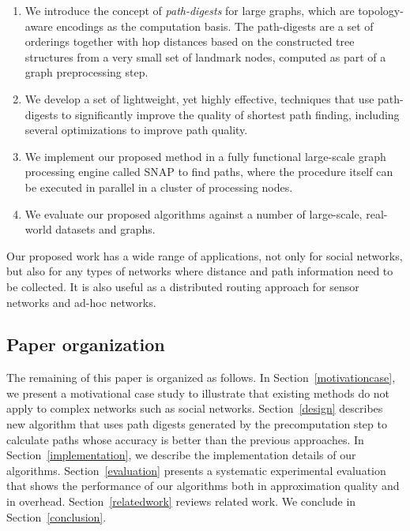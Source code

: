 \begin{enumerate}
  \item We introduce the concept of \emph{path-digests} for large graphs, which are topology-aware encodings as the computation basis. The path-digests are a set of orderings together with hop distances based on the constructed tree structures from a very small set of landmark nodes, computed as part of a graph preprocessing step.
  \item We develop a set of lightweight, yet highly effective, techniques that use path-digests to significantly improve the quality of shortest path finding, including several optimizations to improve path quality.
  \item We implement our proposed method in a fully functional large-scale graph processing engine called SNAP to find paths, where the procedure itself can be executed in parallel in a cluster of processing nodes.
  \item We evaluate our proposed algorithms against a number of large-scale, real-world datasets and graphs.
\end{enumerate}

Our proposed work has a wide range of applications, not only for social networks, but also for any types of networks where distance and path information need to be collected. It is also useful as a distributed routing approach for sensor networks and ad-hoc networks.

\subsection{Paper organization}

The remaining of this paper is organized as follows. In Section~\ref{motivationcase}, we present a motivational case study to illustrate that existing methods do not apply to complex networks such as social networks. Section~\ref{design} describes new algorithm that uses path digests generated by the precomputation step to calculate paths whose accuracy is better than the previous approaches. In Section~\ref{implementation}, we describe the implementation details of our algorithms. Section~\ref{evaluation} presents a systematic experimental evaluation that
shows the performance of our algorithms both in approximation quality and in overhead. Section~\ref{relatedwork} reviews related work. We conclude in Section~\ref{conclusion}. 
